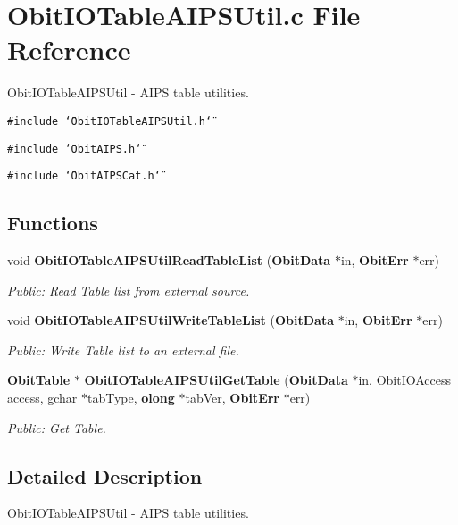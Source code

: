 \section{Obit\-IOTable\-AIPSUtil.c File Reference}
\label{ObitIOTableAIPSUtil_8c}
Obit\-IOTable\-AIPSUtil - AIPS table utilities. 

{\tt \#include \char`\"{}Obit\-IOTable\-AIPSUtil.h\char`\"{}}\par
{\tt \#include \char`\"{}Obit\-AIPS.h\char`\"{}}\par
{\tt \#include \char`\"{}Obit\-AIPSCat.h\char`\"{}}\par
\subsection*{Functions}
\begin{CompactItemize}
\item 
void {\bf Obit\-IOTable\-AIPSUtil\-Read\-Table\-List} ({\bf Obit\-Data} $\ast$in, {\bf Obit\-Err} $\ast$err)
\begin{CompactList}\small\item\em Public: Read Table list from external source. \item\end{CompactList}\item 
void {\bf Obit\-IOTable\-AIPSUtil\-Write\-Table\-List} ({\bf Obit\-Data} $\ast$in, {\bf Obit\-Err} $\ast$err)
\begin{CompactList}\small\item\em Public: Write Table list to an external file. \item\end{CompactList}\item 
{\bf Obit\-Table} $\ast$ {\bf Obit\-IOTable\-AIPSUtil\-Get\-Table} ({\bf Obit\-Data} $\ast$in, Obit\-IOAccess access, gchar $\ast$tab\-Type, {\bf olong} $\ast$tab\-Ver, {\bf Obit\-Err} $\ast$err)
\begin{CompactList}\small\item\em Public: Get Table. \item\end{CompactList}\end{CompactItemize}


\subsection{Detailed Description}
Obit\-IOTable\-AIPSUtil - AIPS table utilities. 



